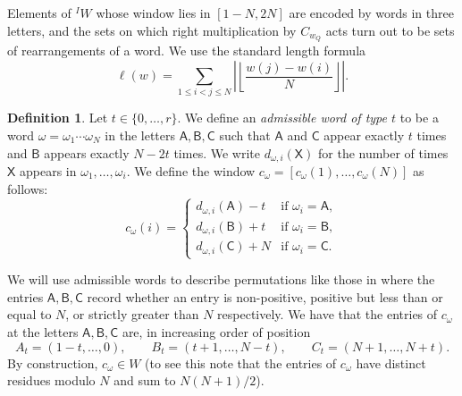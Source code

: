 \documentclass[11pt,a4paper,reqno]{amsart}
\numberwithin{equation}{section}
\theoremstyle{definition}
\newtheorem{definition}[theorem]{Definition}
\theoremstyle{remark}
\theoremstyle{plain}
\newcommand{\A}{\mathsf A}
\newcommand{\B}{\mathsf B}
\newcommand{\CC}{\mathsf C}
\begin{document}
Elements of ${}^IW$ whose window lies in $[1-N,2N]$ are encoded by words in three letters, and the sets on which
right multiplication by $C_{w_Q}$ acts turn out to be sets of rearrangements of a word. We use the standard length
formula \cite[Section~8.3]{BB}
\begin{equation}\label{eq:affine-window-length}
 \ell(w)=\sum_{1\leq i<j\leq N}
 \left|\left\lfloor\frac{w(j)-w(i)}N\right\rfloor\right|.
\end{equation}

\begin{definition}\label{def:words}
Let $t\in\{0,\ldots,r\}$. We define an
\emph{admissible word of type $t$} to be a word
$\omega=\omega_1\cdots\omega_N$ in the letters $\A,\B,\CC$ 
such that  $\A$  and $\CC$ appear  exactly $t$ times and 
$\B$ appears exactly  $N-2t$ times. 
We write $d_{\omega,i}(\mathsf X)$ for the number of times $\mathsf X$
appears in  
$\omega_1,\ldots,\omega_i$. We define the window $c_\omega=[c_\omega(1),\ldots,c_\omega(N)]$ as follows:
\[
 c_\omega(i)=
 \begin{cases}
  d_{\omega,i}(\A)-t & \text{if }\omega_i=\A,\\
  d_{\omega,i}(\B)+t & \text{if }\omega_i=\B,\\
  d_{\omega,i}(\CC)+N & \text{if }\omega_i=\CC.
 \end{cases}
\]
\end{definition}

We will use admissible words to describe permutations like those in 
 where the entries $\A,\B,\CC$ record whether an entry is non-positive, positive but less than or equal to $N$, or strictly greater than $N$ respectively.  We have that 
the entries of $c_\omega$ at the letters $\A,\B,\CC$ are, in increasing order of position 
  \begin{equation}\label{eq:lists}
   A_t=(1-t,\ldots,0),\qquad
   B_t=(t+1,\ldots,N-t),\qquad
   C_t=(N+1,\ldots,N+t).
  \end{equation}
%
 By construction, $c_\omega\in W$ (to see this note that the entries of $c_\omega$ have distinct residues modulo $N$ and sum to $N(N+1)/2$).
\end{document}

